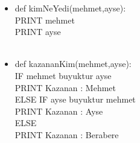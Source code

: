 \documentclass{article}
\begin{document}
\begin{itemize}
		
		\item def kimNeYedi(mehmet,ayse):\\
		PRINT mehmet\\
		PRINT ayse\\ \\
			
		\newpage
		\item def kazananKim(mehmet,ayse):\\
		IF mehmet buyuktur ayse\\
		PRINT Kazanan : Mehmet\\
		ELSE IF ayse buyuktur mehmet\\
		PRINT Kazanan : Ayse\\
		ELSE\\
		PRINT Kazanan : Berabere
		
			
		
	\end{itemize}
		
		
	
	
\end{document}
